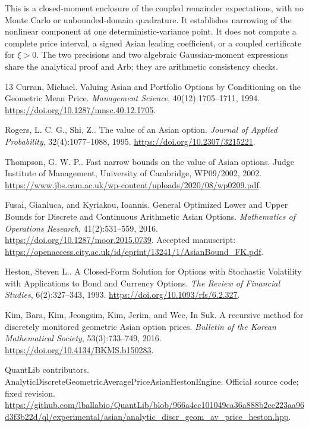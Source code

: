 This is a closed-moment enclosure of the coupled remainder expectations,
with no Monte Carlo or unbounded-domain quadrature. It establishes narrowing
of the nonlinear component at one deterministic-variance point. It does not
compute a complete price interval, a signed Asian leading coefficient, or a
coupled certificate for \(\xi>0\). The two precisions and two algebraic
Gaussian-moment expressions share the analytical proof and Arb; they are
arithmetic consistency checks.

\begin{thebibliography}{13}
Curran, Michael.
Valuing {Asian} and Portfolio Options by Conditioning on the Geometric Mean Price.
\emph{Management Science}, 40(12):1705--1711, 1994.
\url{https://doi.org/10.1287/mnsc.40.12.1705}.

Rogers, L. C. G., Shi, Z..
The value of an {Asian} option.
\emph{Journal of Applied Probability}, 32(4):1077--1088, 1995.
\url{https://doi.org/10.2307/3215221}.

Thompson, G. W. P..
Fast narrow bounds on the value of {Asian} options.
Judge Institute of Management, University of Cambridge, WP09/2002, 2002.
\url{https://www.jbs.cam.ac.uk/wp-content/uploads/2020/08/wp0209.pdf}.

Fusai, Gianluca, and Kyriakou, Ioannis.
General Optimized Lower and Upper Bounds for Discrete and Continuous Arithmetic {Asian} Options.
\emph{Mathematics of Operations Research}, 41(2):531--559, 2016.
\url{https://doi.org/10.1287/moor.2015.0739}.
Accepted manuscript: \url{https://openaccess.city.ac.uk/id/eprint/13241/1/AsianBound_FK.pdf}.

Heston, Steven L..
A Closed-Form Solution for Options with Stochastic Volatility with Applications to Bond and Currency Options.
\emph{The Review of Financial Studies}, 6(2):327--343, 1993.
\url{https://doi.org/10.1093/rfs/6.2.327}.

Kim, Bara, Kim, Jeongsim, Kim, Jerim, and Wee, In Suk.
A recursive method for discretely monitored geometric {Asian} option prices.
\emph{Bulletin of the Korean Mathematical Society}, 53(3):733--749, 2016.
\url{https://doi.org/10.4134/BKMS.b150283}.

{QuantLib contributors}.
{AnalyticDiscreteGeometricAveragePriceAsianHestonEngine}.
Official source code; fixed revision.
\url{https://github.com/lballabio/QuantLib/blob/966a4cc101049ca36a888b2ce223aa96d3f3b22d/ql/experimental/asian/analytic_discr_geom_av_price_heston.hpp}.


\end{thebibliography}
